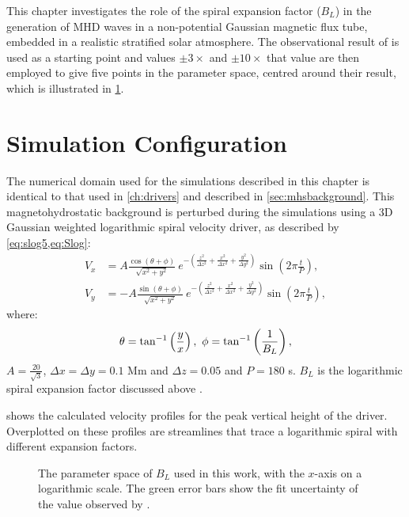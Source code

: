 \documentclass[a4paper,12pt,fourier,authoryear,custommargin]{Classes/PhDThesisPSnPDF}
\begin{document}
This chapter investigates the role of the spiral expansion factor ($B_L$) in the generation of MHD waves in a non-potential Gaussian magnetic flux tube, embedded in a realistic stratified solar atmosphere.
The observational result of \cite{bonet2008} is used as a starting point and values $\pm 3\times$ and $\pm 10\times$ that value are then employed to give five points in the parameter space, centred around their result, which is illustrated in \cref{fig:B-L-values}.


\section{Simulation Configuration}\label{sec:simconfig}
The numerical domain used for the simulations described in this chapter is identical to that used in \cref{ch:drivers} and described in \cref{sec:mhsbackground}.
This magnetohydrostatic background is perturbed during the simulations using a 3D Gaussian weighted logarithmic spiral velocity driver, as described by \cref{eq:slog5,eq:Slog}:
\begin{subequations}
    \begin{align}
    V_x &= A \frac{\cos(\theta + \phi)}{\sqrt{x^2 + y^2}}\ e^{-\left(\frac{z^2}{\Delta z^2} + \frac{x^2}{\Delta x^2} + \frac{y^2}{\Delta y^2}\right)} \sin \left(2\pi \frac{t}{P}\right),\\
    V_y &= - A \frac{\sin(\theta + \phi)}{\sqrt{x^2 + y^2}}\ e^{-\left(\frac{z^2}{\Delta z^2} + \frac{x^2}{\Delta x^2} + \frac{y^2}{\Delta y^2}\right)} \sin \left(2\pi \frac{t}{P}\right),
    \end{align}
    \label{eq:slog5}
\end{subequations}
where:
\begin{equation*}
\theta = \tan^{-1}\left(\frac{y}{x}\right),\ \phi = \tan^{-1}\left(\frac{1}{B_L}\right),\notag	
\end{equation*}
$A=\frac{20}{\sqrt{3}}$, $\Delta x = \Delta y = 0.1$ Mm and $\Delta z = 0.05$ and $P=180$ s.
$B_L$ is the logarithmic spiral expansion factor discussed above  \citep{mumford2015}.

 shows the calculated velocity profiles for the peak vertical height of the driver.
Overplotted on these profiles are streamlines that trace a logarithmic spiral with different expansion factors.



\begin{figure}[h]
    \centering
    \caption{The parameter space of $B_L$ used in this work, with the $x$-axis on a logarithmic scale. The green error bars show the fit uncertainty of the value observed by \citet{bonet2008}.}
    \label{fig:B-L-values}
\end{figure}
\end{document}
